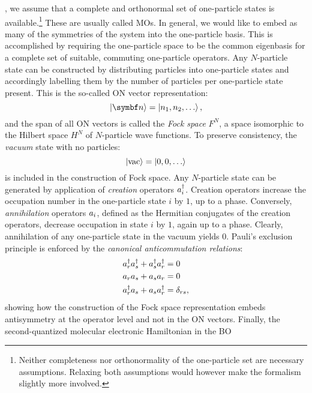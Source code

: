 , we assume that a
complete and orthonormal
set of one-particle states is
available.\footnote{Neither completeness
nor orthonormality of the one-particle set are necessary assumptions.
Relaxing both assumptions would however make the formalism slightly more
involved.}
These are usually called \glspl{MO}.
In general, we would like to embed as many of the symmetries of the
system into the one-particle basis. This is accomplished by requiring
the one-particle space to be the common eigenbasis for a complete set of
suitable, commuting one-particle operators.\autocite{Gross1991-hi}
Any $N$-particle state can be constructed by distributing particles
into one-particle states and accordingly labelling them by the number of
particles per one-particle state present.
This is the so-called \gls{ON} vector representation:
\begin{equation}
  \ket{\vect{n}} = \ket{n_1,n_2,\ldots},
\end{equation}
and the span of all \acrshort{ON} vectors is called the \emph{Fock
space} $F^N$, a space isomorphic to the Hilbert space $H^N$ of
$N$-particle wave functions.
To preserve consistency, the \emph{vacuum} state with no particles:
\begin{equation}
 \ket{\mathrm{vac}} = \ket{0,0,\ldots}
\end{equation}
is included in the construction of Fock space.
Any $N$-particle state can be generated by application of
\emph{creation} operators $a_{i}^{\dagger}$. Creation operators increase the
occupation number in the one-particle state $i$ by $1$, up to a
phase. Conversely, \emph{annihilation} operators $a_{i}$, defined as the Hermitian
conjugates of the creation operators, decrease occupation in state $i$
by $1$, again up to a phase. Clearly, annihilation of any one-particle
state in the vacuum yields $0$.
Pauli's exclusion principle is enforced by the \emph{canonical
anticommutation relations}:
\begin{subequations}
  \begin{align}
    a_{r}^{\dagger}a_{s}^{\dagger} + a_{s}^{\dagger}a_{r}^{\dagger} &= 0 \\
    a_{r}a_{s} + a_{s}a_{r} &= 0 \\
    a_{r}^{\dagger}a_{s} + a_{s}a_{r}^{\dagger} &= \delta_{rs},
  \end{align}
\end{subequations}
showing how the construction of the Fock space representation
embeds antisymmetry at the operator level and not in the \gls{ON} vectors.
Finally, the second-quantized molecular electronic Hamiltonian in the \acrlong{BO}
